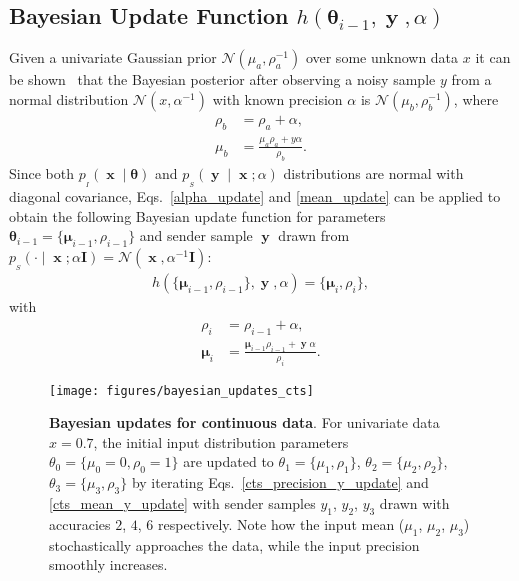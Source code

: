 \documentclass[11pt,table]{article}
\DeclareMathOperator{\x}{\mathbf{x}}
\DeclareMathOperator{\y}{\mathbf{y}}
\newcommand{\pt}[1]{\rho_{#1}}
\newcommand{\mt}[1]{\boldsymbol{\mu}_{#1}}
\newcommand{\N}[2]{\mathcal{N}\left(#1 , #2\right)}
\newcommand{\I}[1]{\boldsymbol{I}}
\newcommand{\tidx}[2]{#1_{#2}}
\renewcommand{\vec}[1]{\boldsymbol{#1}}
\newcommand{\pars}{\theta}
\newcommand{\parsn}{\vec{\pars}}
\newcommand{\parsnt}[1]{\tidx{\parsn}{#1}}
\newcommand{\0}[1]{\constvec{0}{#1}}
\newcommand{\1}[1]{\constvec{1}{#1}}
\newcommand{\sender}[2]{p_{_S}\left(#1 \mid #2\right)}
\newcommand{\inp}{p_{_I}}
\begin{document}
\subsection{Bayesian Update Function \texorpdfstring{$h(\parsnt{i-1}, \y, \alpha)$}{}}
Given a univariate Gaussian prior $\N{\mu_a}{\pt{a}^{-1}}$ over some unknown data $x$ it can be shown~\citep{murphy2007conjugate} that the Bayesian posterior after observing a noisy sample $y$ from a normal distribution $\N{x}{\alpha^{-1}}$ with known precision $\alpha$ is $\N{\mu_b}{\pt{b}^{-1}}$, where
\begin{align}
\pt{b} &= \pt{a} + \alpha\label{alpha_update},\\
\mu_b &= \frac{\mu_a \pt{a}  + y \alpha}{\pt{b}}\label{mean_update}.
\end{align}
Since both $\inp(\x \mid \parsn)$ and $\sender{\y}{\x; \alpha}$ distributions are normal with diagonal covariance,  Eqs.~\ref{alpha_update} and \ref{mean_update} can be applied to obtain the following Bayesian update function for parameters $\parsnt{i-1} = \{\mt{i-1}, \pt{i-1}\}$ and sender sample $\y$ drawn from $\sender{\cdot}{\x; \alpha \I{D}} = \N{\x}{\alpha^{-1}\I{D}}$:
\begin{align}
h(\{\mt{i-1}, \pt{i-1}\}, \y, \alpha) = \{\mt{i}, \pt{i}\},
\end{align}
with
\begin{align}
\pt{i} &= \pt{i-1} + \alpha\label{cts_precision_y_update},\\
\mt{i} &= \frac{\mt{i-1} \pt{i-1} + \y \alpha}{\pt{i}}.\label{cts_mean_y_update}
\end{align}
\begin{figure}[t!]
\texttt{[image: figures/bayesian\_updates\_cts]}
\caption{\textbf{Bayesian updates for continuous data}. For univariate data $x=0.7$, the initial input distribution parameters $\theta_0 = \{\mu_0=0, \rho_0=1\}$ are updated to $\theta_1=\{\mu_1, \rho_1\}$, $\theta_2=\{\mu_2, \rho_2\}$, $\theta_3=\{\mu_3, \rho_3\}$ by iterating Eqs.~\ref{cts_precision_y_update} and \ref{cts_mean_y_update} with sender samples $y_1$, $y_2$, $y_3$ drawn with accuracies $2$, $4$, $6$ respectively. Note how the input mean ($\mu_1$, $\mu_2$, $\mu_3$) stochastically approaches the data, while the input precision smoothly increases.}
\end{figure}
\end{document}

